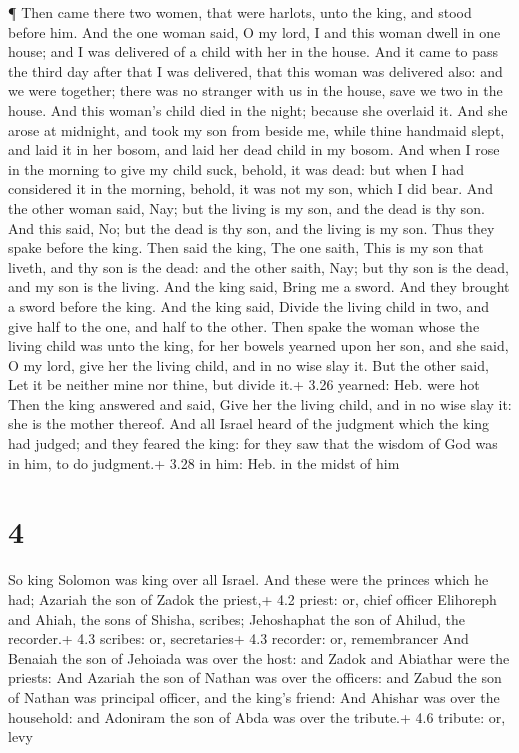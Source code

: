  ¶ Then came there two women, that were harlots, unto the
king, and stood before him.  And the one woman said, O my
lord, I and this woman dwell in one house; and I was delivered of a
child with her in the house.  And it came to pass the third
day after that I was delivered, that this woman was delivered also: and
we were together; there was no stranger with us in the house, save we
two in the house.  And this woman's child died in the
night; because she overlaid it.  And she arose at midnight,
and took my son from beside me, while thine handmaid slept, and laid it
in her bosom, and laid her dead child in my bosom.  And
when I rose in the morning to give my child suck, behold, it was dead:
but when I had considered it in the morning, behold, it was not my son,
which I did bear.  And the other woman said, Nay; but the
living is my son, and the dead is thy son. And this said, No; but the
dead is thy son, and the living is my son. Thus they spake before the
king.  Then said the king, The one saith, This is my son
that liveth, and thy son is the dead: and the other saith, Nay; but thy
son is the dead, and my son is the living.  And the king
said, Bring me a sword. And they brought a sword before the king.
 And the king said, Divide the living child in two, and
give half to the one, and half to the other.  Then spake
the woman whose the living child was unto the king, for her bowels
yearned upon her son, and she said, O my lord, give her the living
child, and in no wise slay it. But the other said, Let it be neither
mine nor thine, but divide it.+ 3.26 yearned: Heb. were hot
 Then the king answered and said, Give her the living
child, and in no wise slay it: she is the mother thereof. 
And all Israel heard of the judgment which the king had judged; and they
feared the king: for they saw that the wisdom of God was in him, to do
judgment.+ 3.28 in him: Heb. in the midst of him

\hypertarget{section-3}{%
\section{4}\label{section-3}}

 So king Solomon was king over all Israel.  And
these were the princes which he had; Azariah the son of Zadok the
priest,+ 4.2 priest: or, chief officer  Elihoreph and Ahiah,
the sons of Shisha, scribes; Jehoshaphat the son of Ahilud, the
recorder.+ 4.3 scribes: or, secretaries+ 4.3 recorder: or, remembrancer
 And Benaiah the son of Jehoiada was over the host: and
Zadok and Abiathar were the priests:  And Azariah the son of
Nathan was over the officers: and Zabud the son of Nathan was principal
officer, and the king's friend:  And Ahishar was over the
household: and Adoniram the son of Abda was over the tribute.+ 4.6
tribute: or, levy

